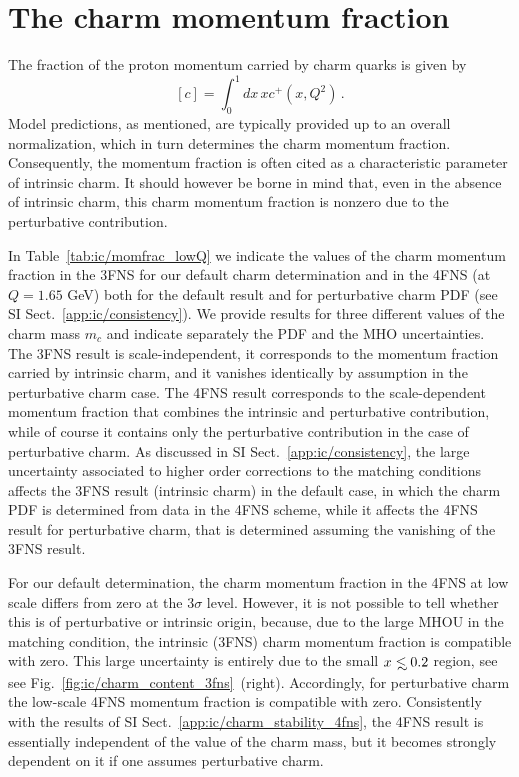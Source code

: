 \section{The charm momentum fraction}
\label{app:ic/charm_mom_frac}

The fraction of the proton momentum carried by charm quarks
is given by
\begin{equation}
\label{eq:ic/charm_momentum_fraction}
\left[ c\right] = \int_0^1dx\, x c^+(x,Q^2) \, .
\end{equation}
Model predictions, as mentioned, are typically provided up to an
overall normalization, which in turn determines the charm momentum fraction.
%
Consequently, the momentum fraction is often cited as a characteristic
parameter of intrinsic charm.
%
It should however be borne in mind that,
even in the absence of intrinsic charm, this charm momentum fraction is nonzero due
to the perturbative contribution.

In Table~\ref{tab:ic/momfrac_lowQ} we indicate
the values of the charm momentum fraction
 in the 3FNS for our default charm
  determination and in the 4FNS  (at $Q=1.65$ GeV) both for the
  default result and for perturbative charm PDF (see SI Sect.~\ref{app:ic/consistency}).
%
We provide results for  three different values of the charm mass $m_c$ and
indicate separately the PDF and the MHO uncertainties.
%
The 3FNS result is scale-independent, it corresponds to the
momentum fraction carried by intrinsic charm, and it vanishes identically
by assumption in the perturbative charm case.
%
The 4FNS result corresponds to
the scale-dependent momentum fraction that combines the intrinsic and
perturbative contribution, while of course it contains only the
perturbative contribution in the case of perturbative charm.
%
As
discussed in SI Sect.~\ref{app:ic/consistency}, the large uncertainty
associated to higher order corrections to the matching conditions
affects the 3FNS result (intrinsic charm) in the default case, in
which the charm PDF is determined from data in the 4FNS scheme, while
it affects the 4FNS result for perturbative charm, that is determined
assuming the vanishing of the 3FNS result.

 For our default determination, the charm
momentum fraction in the 4FNS at low scale
differs from zero at the $3\sigma$
level.
%
However, it is not possible to tell whether this is of
perturbative or intrinsic origin, because, due to  the large MHOU in
the matching condition, the intrinsic (3FNS) charm momentum fraction
is compatible with zero. This large uncertainty is entirely due to the
small $x\lsim 0.2$ region, see see
Fig.~\ref{fig:ic/charm_content_3fns}~(right).
%
Accordingly, for perturbative charm the
low-scale 4FNS
momentum fraction is compatible with zero.
%
Consistently with the results of SI Sect.~\ref{app:ic/charm_stability_4fns},
the 4FNS result is essentially independent of the value of the charm
mass, but it becomes strongly dependent on it if one assumes
perturbative charm.

